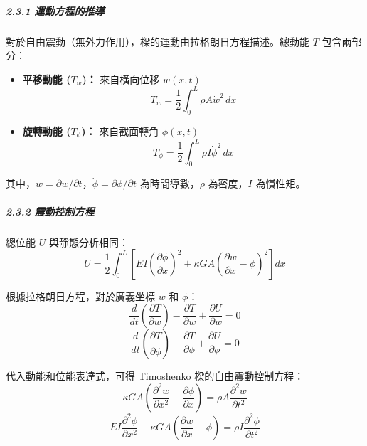 \documentclass[UTF8, a4paper, 12pt]{ctexart}
\begin{document}
\subparagraph{2.3.1 運動方程的推導}

對於自由震動（無外力作用），樑的運動由拉格朗日方程描述。總動能 $T$ 包含兩部分：

\begin{itemize}
  \item \textbf{平移動能 ($T_w$)：} 來自橫向位移 $w(x,t)$
  \begin{equation}
    T_w = \frac{1}{2}\int_0^L \rho A \dot{w}^2 \, dx
  \end{equation}
  
  \item \textbf{旋轉動能 ($T_\phi$)：} 來自截面轉角 $\phi(x,t)$
  \begin{equation}
    T_\phi = \frac{1}{2}\int_0^L \rho I \dot{\phi}^2 \, dx
  \end{equation}
\end{itemize}

其中，$\dot{w} = \partial w/\partial t$，$\dot{\phi} = \partial \phi/\partial t$ 為時間導數，$\rho$ 為密度，$I$ 為慣性矩。

\subparagraph{2.3.2 震動控制方程}

總位能 $U$ 與靜態分析相同：
\begin{equation}
  U = \frac{1}{2}\int_0^L \left[ EI\left(\frac{\partial \phi}{\partial x}\right)^2 + \kappa GA\left(\frac{\partial w}{\partial x} - \phi\right)^2 \right] dx
\end{equation}

根據拉格朗日方程，對於廣義坐標 $w$ 和 $\phi$：
\begin{equation}
  \frac{d}{dt}\left(\frac{\partial T}{\partial \dot{w}}\right) - \frac{\partial T}{\partial w} + \frac{\partial U}{\partial w} = 0
\end{equation}
\begin{equation}
  \frac{d}{dt}\left(\frac{\partial T}{\partial \dot{\phi}}\right) - \frac{\partial T}{\partial \phi} + \frac{\partial U}{\partial \phi} = 0
\end{equation}

代入動能和位能表達式，可得 Timoshenko 樑的自由震動控制方程：
\begin{equation}
  \kappa GA \left( \frac{\partial^2 w}{\partial x^2} - \frac{\partial \phi}{\partial x} \right) = \rho A \frac{\partial^2 w}{\partial t^2}
\end{equation}
\begin{equation}
  EI \frac{\partial^2 \phi}{\partial x^2} + \kappa GA \left( \frac{\partial w}{\partial x} - \phi \right) = \rho I \frac{\partial^2 \phi}{\partial t^2}
\end{equation}
\end{document}

